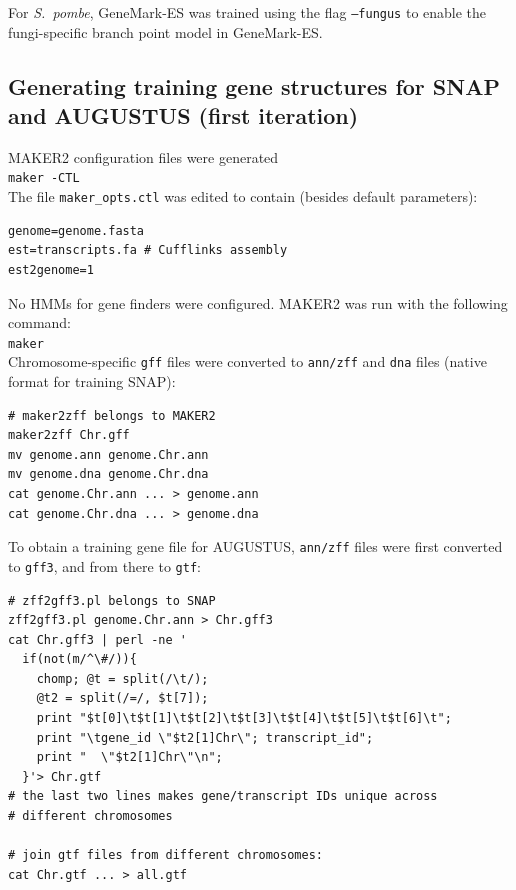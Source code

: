 \documentclass[a4paper,10pt]{report}
\begin{document}
\noindent For \textit{S.~pombe}, GeneMark-ES was trained using the flag \texttt{--fungus} to enable the fungi-specific branch point model in GeneMark-ES.

\subsection{Generating training gene structures for SNAP and AUGUSTUS (first iteration)} \label{training_genes_it1}

MAKER2 configuration files were generated\\

\noindent \texttt{maker -CTL}\\

\noindent The file \texttt{maker\_opts.ctl} was edited to contain (besides default parameters):

\begin{verbatim}
genome=genome.fasta
est=transcripts.fa # Cufflinks assembly
est2genome=1
\end{verbatim}

\noindent No HMMs for gene finders were configured. MAKER2 was run with the following command:\\

\noindent \texttt{maker}\\

\noindent Chromosome-specific \texttt{gff} files were converted to \texttt{ann/zff} and \texttt{dna} files (native format for training SNAP):

\begin{verbatim}
# maker2zff belongs to MAKER2
maker2zff Chr.gff
mv genome.ann genome.Chr.ann
mv genome.dna genome.Chr.dna
cat genome.Chr.ann ... > genome.ann
cat genome.Chr.dna ... > genome.dna
\end{verbatim}

\noindent To obtain a training gene file for AUGUSTUS, \texttt{ann/zff} files were first converted to \texttt{gff3}, and from there to \texttt{gtf}:

\begin{verbatim}
# zff2gff3.pl belongs to SNAP
zff2gff3.pl genome.Chr.ann > Chr.gff3
cat Chr.gff3 | perl -ne '
  if(not(m/^\#/)){
    chomp; @t = split(/\t/); 
    @t2 = split(/=/, $t[7]);
    print "$t[0]\t$t[1]\t$t[2]\t$t[3]\t$t[4]\t$t[5]\t$t[6]\t";
    print "\tgene_id \"$t2[1]Chr\"; transcript_id"; 
    print "  \"$t2[1]Chr\"\n";
  }'> Chr.gtf
# the last two lines makes gene/transcript IDs unique across 
# different chromosomes

# join gtf files from different chromosomes:
cat Chr.gtf ... > all.gtf
\end{verbatim}
\end{document}
